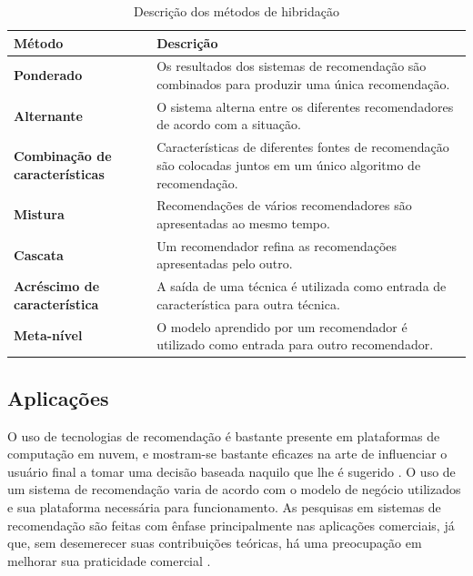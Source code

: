 \documentclass[
	12pt,				%
	oneside,			%
	a4paper,			%
	chapter=TITLE,		%
	english,			%
	french,				%
	spanish,			%
	brazil				%
	]{abntex2}
\begin{document}
\begin{table}[ht]
    \centering
    \ABNTEXchapterfont
    \caption{Descrição dos métodos de hibridação}
    \begin{tabular}{|m{4.0cm}|m{10.0cm}|}
    \hline
        \textbf{Método} & \textbf{Descrição} \\
        \hline
        \hline
        \textbf{Ponderado} & Os resultados dos sistemas de recomendação são combinados para produzir uma única recomendação. \\
        \hline
        \textbf{Alternante} & O sistema alterna entre os diferentes recomendadores de acordo com a situação. \\
        \hline
        \textbf{Combinação de características} &  Características de diferentes fontes de recomendação são colocadas juntos em um único algoritmo de recomendação. \\
        \hline
        \textbf{Mistura} & Recomendações de vários recomendadores são apresentadas ao mesmo tempo. \\
        \hline
        \textbf{Cascata} & Um recomendador refina as recomendações apresentadas pelo outro. \\
        \hline
        \textbf{Acréscimo de característica} & A saída de uma técnica é utilizada como entrada de característica para outra técnica. \\
        \hline
        \textbf{Meta-nível} & O modelo aprendido por um recomendador é utilizado como entrada para outro recomendador. \\
        \hline
    \end{tabular}
    \label{tab:hybrid}
\end{table}

\subsection{Aplicações}

O uso de tecnologias de recomendação é bastante presente em plataformas de computação em nuvem, e mostram-se bastante eficazes na arte de influenciar o usuário final a tomar uma decisão baseada naquilo que lhe é sugerido \cite{shani2011evaluating}. O uso de um sistema de recomendação varia de acordo com o modelo de negócio utilizados e sua plataforma necessária para funcionamento. As pesquisas em sistemas de recomendação são feitas com ênfase principalmente nas aplicações comerciais, já que, sem desemerecer suas contribuições teóricas, há uma preocupação em melhorar sua praticidade comercial \cite{ricci2011introduction}.
\end{document}

